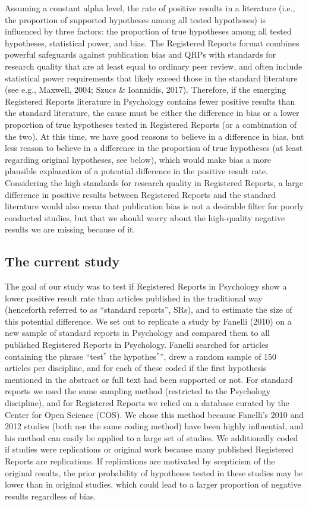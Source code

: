 \documentclass[british,,jou,floatsintext]{apa6}
\begin{document}
Assuming a constant alpha level, the rate of positive results in a literature (i.e., the proportion of supported hypotheses among all tested hypotheses) is influenced by three factors: the proportion of true hypotheses among all tested hypotheses, statistical power, and bias.
The Registered Reports format combines powerful safeguards against publication bias and QRPs with standards for research quality that are at least equal to ordinary peer review, and often include statistical power requirements that likely exceed those in the standard literature (see e.g., Maxwell, 2004; Szucs \& Ioannidis, 2017).
Therefore, if the emerging Registered Reports literature in Psychology contains fewer positive results than the standard literature, the cause must be either the difference in bias or a lower proportion of true hypotheses tested in Registered Reports (or a combination of the two).
At this time, we have good reasons to believe in a difference in bias, but less reason to believe in a difference in the proportion of true hypotheses (at least regarding original hypotheses, see below), which would make bias a more plausible explanation of a potential difference in the positive result rate.
Considering the high standards for research quality in Registered Reports, a large difference in positive results between Registered Reports and the standard literature would also mean that publication bias is not a desirable filter for poorly conducted studies, but that we should worry about the high-quality negative results we are missing because of it.

\hypertarget{the-current-study}{%
\subsection{The current study}\label{the-current-study}}

The goal of our study was to test if Registered Reports in Psychology show a lower positive result rate than articles published in the traditional way (henceforth referred to as \enquote{standard reports}, SRs), and to estimate the size of this potential difference.
We set out to replicate a study by Fanelli (2010) on a new sample of standard reports in Psychology and compared them to all published Registered Reports in Psychology.
Fanelli searched for articles containing the phrase \enquote{test\(^\ast\) the hypothes\(^\ast\)}, drew a random sample of 150 articles per discipline, and for each of these coded if the first hypothesis mentioned in the abstract or full text had been supported or not.
For standard reports we used the same sampling method (restricted to the Psychology discipline), and for Registered Reports we relied on a database curated by the Center for Open Science (COS).
We chose this method because Fanelli's 2010 and 2012 studies (both use the same coding method) have been highly influential, and his method can easily be applied to a large set of studies.
We additionally coded if studies were replications or original work because many published Registered Reports are replications.
If replications are motivated by scepticism of the original results, the prior probability of hypotheses tested in these studies may be lower than in original studies, which could lead to a larger proportion of negative results regardless of bias.
\end{document}
